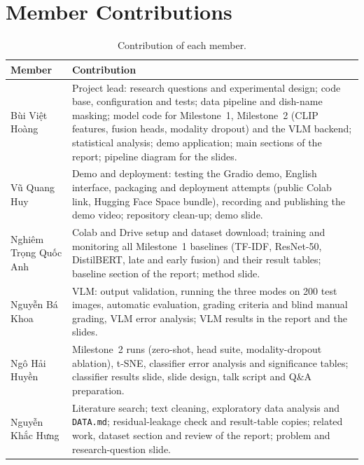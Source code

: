 \documentclass[11pt,a4paper]{article}
\newcommand{\vn}[1]{{\fontencoding{T5}\selectfont #1}}   %
\begin{document}
\clearpage
\appendix
\section{Member Contributions}

\begin{table}[!htbp]
\centering
\caption{Contribution of each member.}
\label{tab:contrib}
\small
\begin{tabularx}{\linewidth}{l >{\raggedright\arraybackslash}X}
\toprule
Member & Contribution \\
\midrule
\vn{Bùi Việt Hoàng} & Project lead: research questions and experimental design; code base, configuration and tests;
data pipeline and dish-name masking; model code for Milestone~1, Milestone~2 (CLIP features, fusion heads,
modality dropout) and the VLM backend; statistical analysis; demo application; main sections of the report;
pipeline diagram for the slides. \\
\addlinespace
\vn{Vũ Quang Huy} & Demo and deployment: testing the Gradio demo, English interface, packaging and
deployment attempts (public Colab link, Hugging Face Space bundle), recording and publishing the demo video;
repository clean-up; demo slide. \\
\addlinespace
\vn{Nghiêm Trọng Quốc Anh} & Colab and Drive setup and dataset download; training and monitoring all
Milestone~1 baselines (TF-IDF, ResNet-50, DistilBERT, late and early fusion) and their result tables; baseline
section of the report; method slide. \\
\addlinespace
\vn{Nguyễn Bá Khoa} & VLM: output validation, running the three modes on 200 test images, automatic
evaluation, grading criteria and blind manual grading, VLM error analysis; VLM results in the report and the
slides. \\
\addlinespace
\vn{Ngô Hải Huyền} & Milestone~2 runs (zero-shot, head suite, modality-dropout ablation), t-SNE,
classifier error analysis and significance tables; classifier results slide, slide design, talk script and
Q\&A preparation. \\
\addlinespace
\vn{Nguyễn Khắc Hưng} & Literature search; text cleaning, exploratory data analysis and
\texttt{DATA.md}; residual-leakage check and result-table copies; related work, dataset section and review of
the report; problem and research-question slide. \\
\bottomrule
\end{tabularx}
\end{table}
\end{document}
